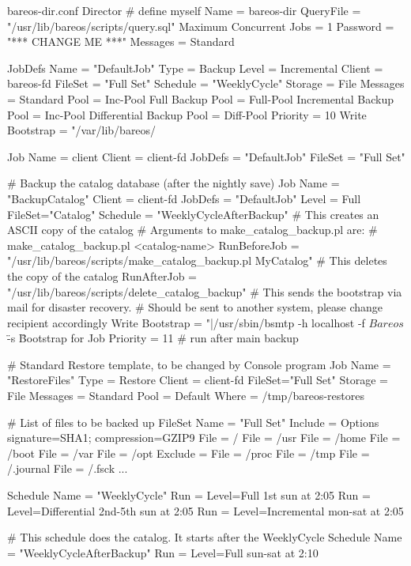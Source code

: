 \begin{bconfig}{bareos-dir.conf}
Director {          # define myself
  Name = bareos-dir
  QueryFile = "/usr/lib/bareos/scripts/query.sql"
  Maximum Concurrent Jobs = 1
  Password = "*** CHANGE ME ***"
  Messages = Standard
}

JobDefs {
  Name = "DefaultJob"
  Type = Backup
  Level = Incremental
  Client = bareos-fd
  FileSet = "Full Set"
  Schedule = "WeeklyCycle"
  Storage = File
  Messages = Standard
  Pool = Inc-Pool
  Full Backup Pool = Full-Pool
  Incremental Backup Pool = Inc-Pool
  Differential Backup Pool = Diff-Pool
  Priority = 10
  Write Bootstrap = "/var/lib/bareos/%
}

Job {
  Name = client
  Client = client-fd
  JobDefs = "DefaultJob"
  FileSet = "Full Set"
}

# Backup the catalog database (after the nightly save)
Job {
  Name = "BackupCatalog"
  Client = client-fd
  JobDefs = "DefaultJob"
  Level = Full
  FileSet="Catalog"
  Schedule = "WeeklyCycleAfterBackup"
  # This creates an ASCII copy of the catalog
  # Arguments to make_catalog_backup.pl are:
  #  make_catalog_backup.pl <catalog-name>
  RunBeforeJob = "/usr/lib/bareos/scripts/make_catalog_backup.pl MyCatalog"
  # This deletes the copy of the catalog
  RunAfterJob  = "/usr/lib/bareos/scripts/delete_catalog_backup"
  # This sends the bootstrap via mail for disaster recovery.
  # Should be sent to another system, please change recipient accordingly
  Write Bootstrap = "|/usr/sbin/bsmtp -h localhost -f \"\(Bareos\) \" -s \"Bootstrap for Job %
  Priority = 11                   # run after main backup
}

# Standard Restore template, to be changed by Console program
Job {
  Name = "RestoreFiles"
  Type = Restore
  Client = client-fd
  FileSet="Full Set"
  Storage = File
  Messages = Standard
  Pool = Default
  Where = /tmp/bareos-restores
}

# List of files to be backed up
FileSet {
  Name = "Full Set"
  Include = {
    Options {
      signature=SHA1;
      compression=GZIP9
    }
    File = /
    File = /usr
    File = /home
    File = /boot
    File = /var
    File = /opt
  }
  Exclude = {
    File = /proc
    File = /tmp
    File = /.journal
    File = /.fsck
    ...
  }
}

Schedule {
  Name = "WeeklyCycle"
  Run = Level=Full 1st sun at 2:05
  Run = Level=Differential 2nd-5th sun at 2:05
  Run = Level=Incremental mon-sat at 2:05
}

# This schedule does the catalog. It starts after the WeeklyCycle
Schedule {
  Name = "WeeklyCycleAfterBackup"
  Run = Level=Full sun-sat at 2:10
}


\end{bconfig}
